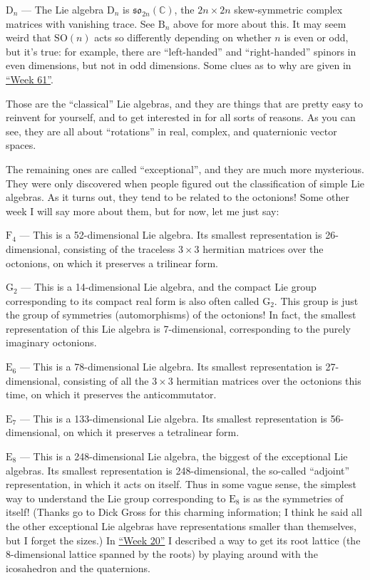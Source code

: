 \documentclass{article}
\begin{document}
\(\mathrm{D}_n\) --- The Lie algebra \(\mathrm{D}_n\) is
\(\mathfrak{so}_{2n}(\mathbb{C})\), the \(2n \times 2n\) skew-symmetric
complex matrices with vanishing trace. See \(\mathrm{B}_n\) above for
more about this. It may seem weird that \(\mathrm{SO}(n)\) acts so
differently depending on whether \(n\) is even or odd, but it's true:
for example, there are ``left-handed'' and ``right-handed'' spinors in
even dimensions, but not in odd dimensions. Some clues as to why are
given in \protect\hyperlink{week61}{``Week 61''}.

Those are the ``classical'' Lie algebras, and they are things that are
pretty easy to reinvent for yourself, and to get interested in for all
sorts of reasons. As you can see, they are all about ``rotations'' in
real, complex, and quaternionic vector spaces.

The remaining ones are called ``exceptional'', and they are much more
mysterious. They were only discovered when people figured out the
classification of simple Lie algebras. As it turns out, they tend to be
related to the octonions! Some other week I will say more about them,
but for now, let me just say:

\(\mathrm{F}_4\) --- This is a 52-dimensional Lie algebra. Its smallest
representation is 26-dimensional, consisting of the traceless
\(3\times3\) hermitian matrices over the octonions, on which it
preserves a trilinear form.

\(\mathrm{G}_2\) --- This is a 14-dimensional Lie algebra, and the
compact Lie group corresponding to its compact real form is also often
called \(\mathrm{G}_2\). This group is just the group of symmetries
(automorphisms) of the octonions! In fact, the smallest representation
of this Lie algebra is 7-dimensional, corresponding to the purely
imaginary octonions.

\(\mathrm{E}_6\) --- This is a 78-dimensional Lie algebra. Its smallest
representation is 27-dimensional, consisting of all the \(3\times3\)
hermitian matrices over the octonions this time, on which it preserves
the anticommutator.

\(\mathrm{E}_7\) --- This is a 133-dimensional Lie algebra. Its smallest
representation is 56-dimensional, on which it preserves a tetralinear
form.

\(\mathrm{E}_8\) --- This is a 248-dimensional Lie algebra, the biggest
of the exceptional Lie algebras. Its smallest representation is
248-dimensional, the so-called ``adjoint'' representation, in which it
acts on itself. Thus in some vague sense, the simplest way to understand
the Lie group corresponding to \(\mathrm{E}_8\) is as the symmetries of
itself! (Thanks go to Dick Gross for this charming information; I think
he said all the other exceptional Lie algebras have representations
smaller than themselves, but I forget the sizes.) In
\protect\hyperlink{week20}{``Week 20''} I described a way to get its
root lattice (the 8-dimensional lattice spanned by the roots) by playing
around with the icosahedron and the quaternions.
\end{document}
